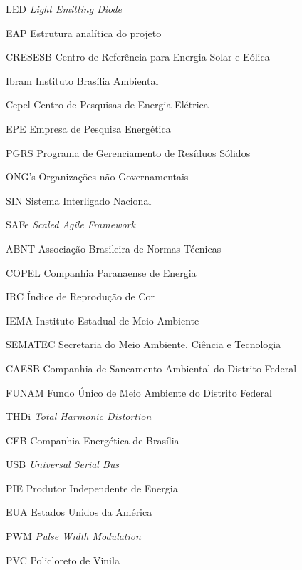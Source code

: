 \begin{siglas}
 \item[LED] \textit {Light Emitting Diode}
  \item[EAP] Estrutura anal\'itica do projeto
  \item[CRESESB] Centro de Refer\^encia para Energia Solar e E\'olica
  \item[Ibram] Instituto Bras\'ilia Ambiental
  \item[Cepel] Centro de Pesquisas de Energia El\'etrica
  \item[EPE] Empresa de Pesquisa Energ\'etica
  \item[PGRS] Programa de Gerenciamento de Res\'iduos S\'olidos
  \item[ONG's] Organiza\c{c}\~oes n\~ao Governamentais
  \item[SIN] Sistema Interligado Nacional
  \item[SAFe] \textit{Scaled Agile Framework}
  \item[ABNT] Associa\c{c}\~ao Brasileira de Normas T\'ecnicas
  \item[COPEL] Companhia Paranaense de Energia
  \item[IRC] \'Indice de Reprodu\c{c}\~ao de Cor
  \item[IEMA] Instituto Estadual de Meio Ambiente
  \item[SEMATEC] Secretaria do Meio Ambiente, Ci\^encia e Tecnologia
  \item[CAESB] Companhia de Saneamento Ambiental do Distrito Federal
  \item[FUNAM] Fundo \'Unico de Meio Ambiente do Distrito Federal
  \item[THDi] \textit{Total Harmonic Distortion}
  \item[CEB] Companhia Energ\'etica de Bras\'ilia
  \item[USB] \textit{Universal Serial Bus}
  \item[PIE] Produtor Independente de Energia
  \item[EUA] Estados Unidos da Am\'erica
  \item[PWM] \textit{Pulse Width Modulation}
  \item[PVC] Policloreto de Vinila
\end{siglas}
